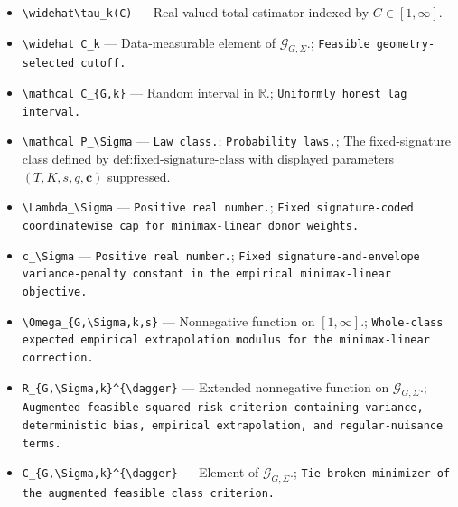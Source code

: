 \documentclass{article}
\begin{document}
\begin{itemize}
  \item \texttt{\textbackslash{}\allowbreak{}widehat\textbackslash{}\allowbreak{}tau\_\allowbreak{}k(C)} --- Real-valued total estimator indexed by \(C\in[1,\infty]\).
  \item \texttt{\textbackslash{}\allowbreak{}widehat C\_\allowbreak{}k} --- Data-measurable element of \(\mathcal G_{G,\Sigma}\).; \texttt{Feasible geometry-\allowbreak{}selected cutoff.}
  \item \texttt{\textbackslash{}\allowbreak{}mathcal C\_\allowbreak{}\{G,\allowbreak{}k\}\allowbreak{}} --- Random interval in \(\mathbb R\).; \texttt{Uniformly honest lag interval.}
  \item \texttt{\textbackslash{}\allowbreak{}mathcal P\_\allowbreak{}\textbackslash{}\allowbreak{}Sigma} --- \texttt{Law class.}; \texttt{Probability laws.}; The fixed-signature class defined by \(\text{def:fixed-signature-class}\) with displayed parameters \((T,K,s,q,\mathbf c)\) suppressed.
  \item \texttt{\textbackslash{}\allowbreak{}Lambda\_\allowbreak{}\textbackslash{}\allowbreak{}Sigma} --- \texttt{Positive real number.}; \texttt{Fixed signature-\allowbreak{}coded coordinatewise cap for minimax-\allowbreak{}linear donor weights.}
  \item \texttt{c\_\allowbreak{}\textbackslash{}\allowbreak{}Sigma} --- \texttt{Positive real number.}; \texttt{Fixed signature-\allowbreak{}and-\allowbreak{}envelope variance-\allowbreak{}penalty constant in the empirical minimax-\allowbreak{}linear objective.}
  \item \texttt{\textbackslash{}\allowbreak{}Omega\_\allowbreak{}\{G,\allowbreak{}\textbackslash{}\allowbreak{}Sigma,\allowbreak{}k,\allowbreak{}s\}\allowbreak{}} --- Nonnegative function on \( [1,\infty]\).; \texttt{Whole-\allowbreak{}class expected empirical extrapolation modulus for the minimax-\allowbreak{}linear correction.}
  \item \texttt{R\_\allowbreak{}\{G,\allowbreak{}\textbackslash{}\allowbreak{}Sigma,\allowbreak{}k\}\allowbreak{}\textasciicircum{}\{\textbackslash{}\allowbreak{}dagger\}\allowbreak{}} --- Extended nonnegative function on \(\mathcal G_{G,\Sigma}\).; \texttt{Augmented feasible squared-\allowbreak{}risk criterion containing variance,\allowbreak{} deterministic bias,\allowbreak{} empirical extrapolation,\allowbreak{} and regular-\allowbreak{}nuisance terms.}
  \item \texttt{C\_\allowbreak{}\{G,\allowbreak{}\textbackslash{}\allowbreak{}Sigma,\allowbreak{}k\}\allowbreak{}\textasciicircum{}\{\textbackslash{}\allowbreak{}dagger\}\allowbreak{}} --- Element of \(\mathcal G_{G,\Sigma}\).; \texttt{Tie-\allowbreak{}broken minimizer of the augmented feasible class criterion.}
\end{itemize}
\end{document}
